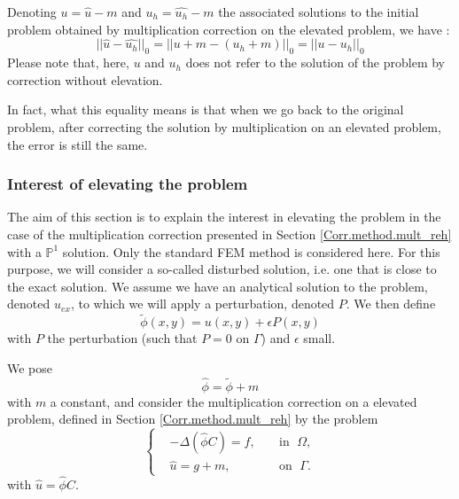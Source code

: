 \begin{enumerate}[label=\textbullet]
	\begin{Rem}
		Denoting $u=\hat{u}-m$ and $u_h=\hat{u_h}-m$ the associated solutions to the initial problem obtained by multiplication correction on the elevated problem, we have : 
		\begin{equation*}
			||\hat{u}-\hat{u_h}||_0=||u+m-(u_h+m)||_0=||u-u_h||_0
		\end{equation*}
		Please note that, here, $u$ and $u_h$ does not refer to the solution of the problem by correction without elevation.
		
		In fact, what this equality means is that when we go back to the original problem, after correcting the solution by multiplication on an elevated problem, the error is still the same.
	\end{Rem}
\end{enumerate}

\subsubsection{Interest of elevating the problem} \label{Corr.theo_results.reh}

The aim of this section is to explain the interest in elevating the problem in the case of the multiplication correction presented in Section \ref{Corr.method.mult_reh} with a $\mathbb{P}^1$ solution. Only the standard FEM method is considered here. For this purpose, we will consider a so-called disturbed solution, i.e. one that is close to the exact solution. We assume we have an analytical solution to the problem, denoted $u_{ex}$, to which we will apply a perturbation, denoted $P$. We then define
\begin{equation*}
	\tilde{\phi}(x,y) = u(x,y)+\epsilon P(x,y)
\end{equation*}
with $P$ the perturbation (such that $P=0$ on $\Gamma$) and $\epsilon$ small.

We pose
\begin{equation*}
	\hat{\phi}=\tilde{\phi}+m
\end{equation*}
with $m$ a constant, and consider the multiplication correction on a elevated problem, defined in Section \ref{Corr.method.mult_reh} by the problem
\begin{equation*}
	\left\{\begin{aligned}
		&-\Delta (\hat{\phi}C)=f, \; &&\text{in } \; \Omega, \\
		&\hat{u}=g+m, \; &&\text{on } \; \Gamma.
	\end{aligned}\right.
\end{equation*}
with $\hat{u}=\hat{\phi}C$.

